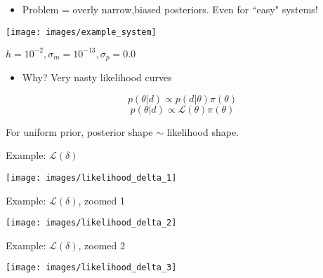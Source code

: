 \documentclass[10pt]{beamer}
\title{}
\subtitle{}
\author{}
\date{EE/GW meeting, November 11, 2023}
\begin{document}
	
	\maketitle
	
	\begin{frame}{}
	
	\begin{itemize}
		\item \alert{Problem = overly narrow,biased posteriors}. Even for ``easy" systems!
	\end{itemize}


\texttt{[image: images/example\_system]}

$h = 10^{-2}, \sigma_m = 10^{-13}, \sigma_p = 0.0$

\end{frame}




	\begin{frame}{}
	
	\begin{itemize}
		\item Why? Very nasty likelihood curves
	\end{itemize}
	
	
	$$  p(\theta | d) \propto p(d | \theta) \pi({\theta})$$
	$$ p(\theta | d) \propto \mathcal{L}(\theta) \pi({\theta})$$
	
		
	For uniform prior, posterior shape $\sim$ likelihood shape. 


\end{frame}



\begin{frame}{}
	
	Example: $\mathcal{L}(\delta)$
	
\texttt{[image: images/likelihood\_delta\_1]}
	
	
\end{frame}

\begin{frame}{}
	
	Example: $\mathcal{L}(\delta)$, zoomed 1
	
	\texttt{[image: images/likelihood\_delta\_2]}
	
	
\end{frame}


\begin{frame}{}
	
	Example: $\mathcal{L}(\delta)$, zoomed 2
	
	\texttt{[image: images/likelihood\_delta\_3]}
	
	
\end{frame}
\end{document}
